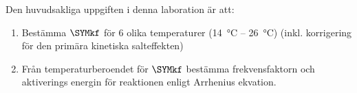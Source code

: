 Den huvudsakliga uppgiften i denna laboration är att:
\begin{enumerate}
\item Bestämma $\SYMkf$ för 6 olika temperaturer (\SI{14}{\degreeCelsius} --
  \SI{26}{\degreeCelsius}) (inkl. korrigering för den primära kinetiska
  salteffekten) 
\item Från temperaturberoendet för $\SYMkf$ bestämma frekvensfaktorn och
  aktiverings energin för reaktionen enligt Arrhenius ekvation.
\end{enumerate}
